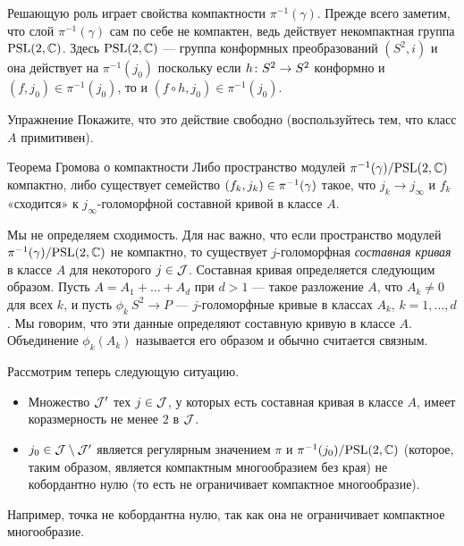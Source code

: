 Решающую роль играет свойства компактности $\pi^{-1} (\gamma)$.
Прежде всего заметим, что слой $\pi^{-1} (\gamma)$ сам по себе не компактен, ведь действует некомпактная группа $\mathrm{PSL}(2, \mathbb{C})$.
Здесь $\mathrm{PSL}(2, \mathbb{C})$ — группа конформных преобразований $(S^2, i)$ и она действует на $\pi^{-1} (j_0)$ поскольку
если $h\: S^2 \z\to S^2$ конформно и $(f, j_0) \in \pi^{-1} (j_0)$, то и $(f \circ h, j_0) \in \pi^{-1} (j_0)$.

\begin{ex*}{Упражнение}
Покажите, что это действие свободно (воспользуйтесь тем, что класс $A$ примитивен).
\end{ex*}

\begin{thm*}{Теорема Громова о компактности}
Либо пространство модулей $\pi^{-1} (\gamma)/\mathrm{PSL}(2, \mathbb{C})$ компактно, либо существует семейство $(f_k, j_k) \z\in \pi^{-1} (\gamma)$ такое, что $j_k \to j_\infty$ и $f_k$ «сходится» к $j_\infty$-голоморфной составной кривой в классе $A$.
\end{thm*}

Мы не определяем сходимость.
Для нас важно, что если пространство модулей $\pi^{-1} (\gamma)/\mathrm{PSL}(2, \mathbb{C})$ не компактно, то существует $j$-голоморфная \emph{составная кривая} в классе $A$ для некоторого $j \in \mathcal{J}$.
Составная кривая определяется следующим образом.
Пусть $A = A_1 +\dots+ A_d$ при $d > 1$ — такое разложение $A$, что $A_k \ne 0$ для всех $k$, и пусть $\phi_k \: S^2 \to P$ — $j$-голоморфные кривые в классах $A_k$, $k = 1,\dots,d$.
Мы говорим, что эти данные определяют составную кривую в классе $A$.
Объединение $\phi_k (A_k)$ называется его образом и обычно считается связным.

Рассмотрим теперь следующую ситуацию.
\begin{itemize}
\item Множество $\mathcal{J}'$ тех $j \in \mathcal{J}$, у которых есть составная кривая в классе $A$, имеет коразмерность не менее $2$ в $\mathcal{J}$.

\item $j_0 \in \mathcal{J}\setminus \mathcal{J}'$ является регулярным значением $\pi$ и $\pi^{-1} (j_0)/\mathrm{PSL}(2, \mathbb{C})$ (которое, таким образом, является компактным многообразием без края) не кобордантно нулю (то есть не ограничивает компактное многообразие).
 
\end{itemize}
Например, точка не кобордантна нулю, так как она не ограничивает компактное многообразие.

